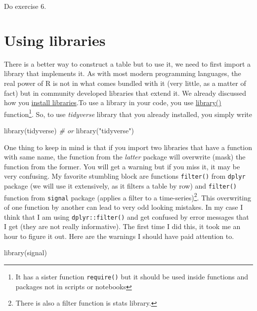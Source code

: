 \documentclass[
]{book}
\newenvironment{Shaded}{\begin{snugshade}}{\end{snugshade}}
\newcommand{\CommentTok}[1]{\textcolor[rgb]{0.56,0.35,0.01}{\textit{#1}}}
\newcommand{\FunctionTok}[1]{\textcolor[rgb]{0.00,0.00,0.00}{#1}}
\newcommand{\NormalTok}[1]{#1}
\newcommand{\StringTok}[1]{\textcolor[rgb]{0.31,0.60,0.02}{#1}}
\begin{document}
Do exercise 6.

\hypertarget{library}{%
\section{Using libraries}\label{library}}

There is a better way to construct a table but to use it, we need to first import a library that implements it. As with most modern programming languages, the real power of R is not in what comes bundled with it (very little, as a matter of fact) but in community developed libraries that extend it. We already discussed how you \protect\hyperlink{install.packages}{install libraries}.To use a library in your code, you use \href{https://www.rdocumentation.org/packages/base/versions/3.6.2/topics/library}{library()} function\footnote{It has a sister function \texttt{require()} but it should be used inside functions and packages not in scripts or notebooks}. So, to use \emph{tidyverse} library that you already installed, you simply write

\begin{Shaded}
\begin{Highlighting}[]
\FunctionTok{library}\NormalTok{(tidyverse)}
\CommentTok{\# or}
\FunctionTok{library}\NormalTok{(}\StringTok{"tidyverse"}\NormalTok{)}
\end{Highlighting}
\end{Shaded}

One thing to keep in mind is that if you import two libraries that have a function with same name, the function from the \emph{latter} package will overwrite (mask) the function from the former. You will get a warning but if you miss it, it may be very confusing. My favorite stumbling block are functions \texttt{filter()} from \texttt{dplyr} package (we will use it extensively, as it filters a table by row) and \texttt{filter()} function from \texttt{signal} package (applies a filter to a time-series)\footnote{There is also a filter function is stats library.}. This overwriting of one function by another can lead to very odd looking mistakes. In my case I think that I am using \texttt{dplyr::filter()} and get confused by error messages that I get (they are not really informative). The first time I did this, it took me an hour to figure it out. Here are the warnings I should have paid attention to.

\begin{Shaded}
\begin{Highlighting}[]
\FunctionTok{library}\NormalTok{(signal)}
\end{Highlighting}
\end{Shaded}
\end{document}
